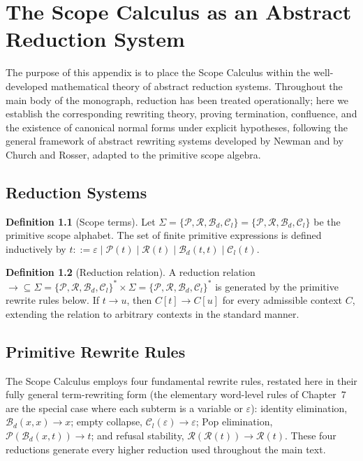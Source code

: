 \documentclass[11pt,twoside,openright]{book}
\numberwithin{equation}{chapter}
\theoremstyle{definition}
\newtheorem{definition}{Definition}[chapter]
\theoremstyle{plain}
\theoremstyle{remark}
\theoremstyle{definition}
\newcommand{\Alphabet}{\Sigma}
\newcommand{\Pop}{\mathcal{P}}
\newcommand{\Refuse}{\mathcal{R}}
\newcommand{\Bind}{\mathcal{B}_d}
\newcommand{\Collapse}{\mathcal{C}_l}
\newcommand{\ScopeAlphabet}{\Alphabet=\{\Pop,\Refuse,\Bind,\Collapse\}}
\begin{document}
\chapter{The Scope Calculus as an Abstract Reduction System}
\label{app:reduction}

The purpose of this appendix is to place the Scope Calculus within the
well-developed mathematical theory of abstract reduction systems.
Throughout the main body of the monograph, reduction has been treated
operationally; here we establish the corresponding rewriting theory,
proving termination, confluence, and the existence of canonical normal
forms under explicit hypotheses, following the general framework of
abstract rewriting systems developed by Newman and by Church and Rosser,
adapted to the primitive scope algebra.

\section{Reduction Systems}

\begin{definition}[Scope terms]
Let $\ScopeAlphabet=\{\Pop,\Refuse,\Bind,\Collapse\}$ be the primitive
scope alphabet. The set of finite primitive expressions is defined
inductively by $t::=\varepsilon\mid\Pop(t)\mid\Refuse(t)\mid\Bind(t,t)\mid\Collapse(t)$.
\end{definition}

\begin{definition}[Reduction relation]
A reduction relation $\to\subseteq\ScopeAlphabet^{*}\times\ScopeAlphabet^{*}$
is generated by the primitive rewrite rules below. If $t\to u$, then
$C[t]\to C[u]$ for every admissible context $C$, extending the relation
to arbitrary contexts in the standard manner.
\end{definition}

\section{Primitive Rewrite Rules}

The Scope Calculus employs four fundamental rewrite rules, restated here
in their fully general term-rewriting form (the elementary word-level
rules of Chapter~7 are the special case where each subterm is a variable
or $\varepsilon$): identity elimination, $\Bind(x,x)\to x$; empty
collapse, $\Collapse(\varepsilon)\to\varepsilon$; Pop elimination,
$\Pop(\Bind(x,t))\to t$; and refusal stability,
$\Refuse(\Refuse(t))\to\Refuse(t)$. These four reductions generate every
higher reduction used throughout the main text.
\end{document}
